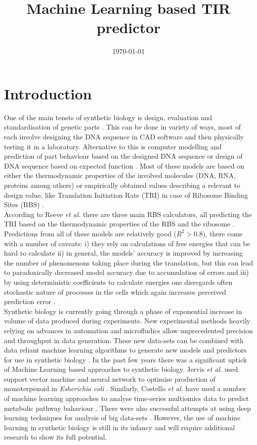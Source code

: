\documentclass{article}
\title{Machine Learning based TIR predictor}
\author{}
\date{\today{}}
\begin{document}
\maketitle

\section{Introduction}

One of the main tenets of synthetic biology is design, evaluation and standardisation of genetic parts \cite{Brophy2014,Canton2008,Stanton2014}. This can be done in variety of ways, most of each involve designing the DNA sequence in CAD software and then physically testing it in a laboratory. Alternative to this is computer modelling and prediction of part behaviour based on the designed DNA sequence or design of DNA sequence based on expected function \cite{Yeoh2019,Nielsen2016}. Most of these models are based on either the thermodynamic properties of the involved molecules (DNA, RNA, proteins among others) or empirically obtained values describing a relevant to design value, like Translation Initiation Rate (TRI) in case of Ribosome Binding Sites (RBS) \cite{Xia1998,Chen2013,Reeve2014}.\\
According to Reeve \emph{et al.} there are three main RBS calculators, all predicting the TRI based on the thermodynamic properties of the RBS and the ribosome \cite{Seo2013,Na2010,Salis2009}. Predictions from all of these models are relatively good ($R^2 >0.8$), there come with a number of caveats: i) they rely on calculations of free energies that can be hard to calculate ii) in general, the models' accuracy is improved by increasing the number of phenomenons taking place during the translation, but this can lead to paradoxically decreased model accuracy due to accumulation of errors \cite{EspahBorujeni2016} and iii) by using deterministic coefficients to calculate energies one disregards often stochastic nature of processes in the cells which again increases perceived prediction error \cite{Goss1998}. \\
Synthetic biology is currently going through a phase of exponential increase in volume of data produced during experiments. \cite{Freemont2019} New experimental methods heavily relying on advances in automation and microfludics allow unprecedented precision and throughput in data generation. These new data-sets can be combined with data reliant machine learning algorithms to generate new models and predictors for use in synthetic biology \cite{Camacho2018}. In the past few years there was a significant uptick of Machine Learning based approaches to synthetic biology. Jervis \emph{et al.} used support vector machine and neural network to optimise production of monoterpenoid in \emph{Esherichia coli} \cite{Jervis2019}. Similarly, Costello \emph{et al.} have used a number of machine learning approaches to analyse time-series multiomics data to predict metabolic pathway bahaviour \cite{Costello2018}. There were also successful attempts at using deep learning techniques for analysis of big data-sets \cite{Alipanahi2015,Angermueller2016}. However, the use of machine learning in synthetic biology is still in its infancy and will require additional research to show its full potential. \\
\end{document}

